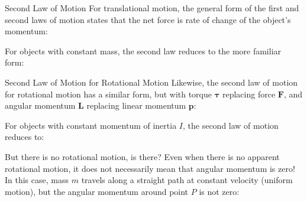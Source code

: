 \documentclass[12pt,compress,aspectratio=169]{beamer}
\begin{document}
\begin{frame}{Second Law of Motion}
  For translational motion, the general form of the first and second laws of
  motion states that the net force is rate of change of the object's momentum:


  For objects with constant mass, the second law reduces to the more familiar
  form:

\end{frame}



\begin{frame}{Second Law of Motion for Rotational Motion}
  Likewise, the second law of motion for rotational motion has a similar
  form, but with torque $\bm\tau$ replacing force $\bm{F}$, and angular
  momentum $\bm{L}$ replacing linear momentum $\bm{p}$:


  For objects with constant momentum of inertia $I$, the second law of motion
  reduces to:

\end{frame}



\begin{frame}{But there is no rotational motion, is there?}
  Even when there is no apparent rotational motion, it does not necessarily
  mean that angular momentum is zero! In this case, mass $m$ travels along a
  straight path at constant velocity (uniform motion), but the angular momentum
  around point $P$ is not zero:
  \begin{center}
  \end{center}
\end{frame}
\end{document}
